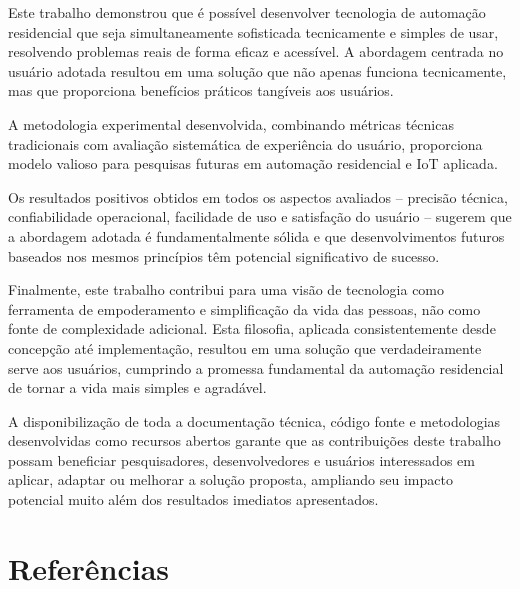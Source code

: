 \documentclass[twoside,english,brazilian]{UNISINOSmonografia}
\begin{document}
Este trabalho demonstrou que é possível desenvolver tecnologia de automação residencial que seja simultaneamente sofisticada tecnicamente e simples de usar, resolvendo problemas reais de forma eficaz e acessível. A abordagem centrada no usuário adotada resultou em uma solução que não apenas funciona tecnicamente, mas que proporciona benefícios práticos tangíveis aos usuários.

A metodologia experimental desenvolvida, combinando métricas técnicas tradicionais com avaliação sistemática de experiência do usuário, proporciona modelo valioso para pesquisas futuras em automação residencial e IoT aplicada.

Os resultados positivos obtidos em todos os aspectos avaliados – precisão técnica, confiabilidade operacional, facilidade de uso e satisfação do usuário – sugerem que a abordagem adotada é fundamentalmente sólida e que desenvolvimentos futuros baseados nos mesmos princípios têm potencial significativo de sucesso.


Finalmente, este trabalho contribui para uma visão de tecnologia como ferramenta de empoderamento e simplificação da vida das pessoas, não como fonte de complexidade adicional. Esta filosofia, aplicada consistentemente desde concepção até implementação, resultou em uma solução que verdadeiramente serve aos usuários, cumprindo a promessa fundamental da automação residencial de tornar a vida mais simples e agradável.

A disponibilização de toda a documentação técnica, código fonte e metodologias desenvolvidas como recursos abertos garante que as contribuições deste trabalho possam beneficiar pesquisadores, desenvolvedores e usuários interessados em aplicar, adaptar ou melhorar a solução proposta, ampliando seu impacto potencial muito além dos resultados imediatos apresentados.

\chapter{Referências}
\end{document}
